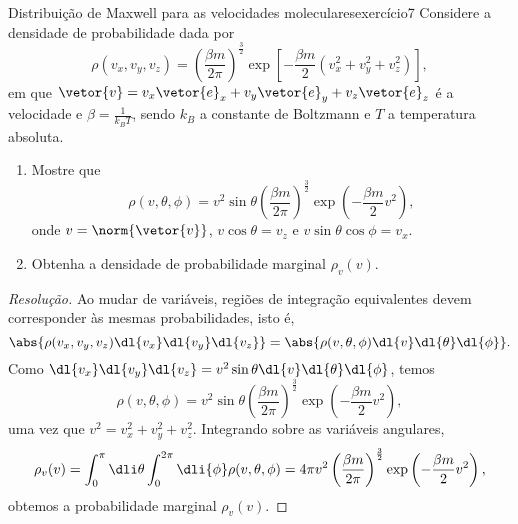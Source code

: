 \begin{exercício}{Distribuição de Maxwell para as velocidades moleculares}{exercício7}
    Considere a densidade de probabilidade dada por
    \begin{equation*}
        \rho(v_x,v_y,v_z) = \left(\frac{\beta m}{2\pi}\right)^{\frac32}\exp\left[-\frac{\beta m}{2} \left(v_x^2 + v_y^2 + v_z^2\right)\right],
    \end{equation*}
    em que \(\vetor{v} = v_x\vetor{e}_x+v_y\vetor{e}_y+v_z\vetor{e}_z\) é a velocidade e \(\beta = \frac{1}{k_BT}\), sendo \(k_B\) a constante de Boltzmann e \(T\) a temperatura absoluta.
    \begin{enumerate}[label=(\alph*)]
        \item Mostre que
            \begin{equation*}
                \rho(v, \theta, \phi) = v^2 \sin\theta\left(\frac{\beta m}{2\pi}\right)^{\frac32}\exp\left(-\frac{\beta m}{2} v^2\right),
            \end{equation*}
            onde \(v = \norm{\vetor{v}}\), \(v\cos\theta = v_z\) e \(v\sin\theta\cos\phi = v_x\).
        \item Obtenha a densidade de probabilidade marginal \(\rho_v(v)\).
    \end{enumerate}
\end{exercício}
\begin{proof}[Resolução]
    Ao mudar de variáveis, regiões de integração equivalentes devem corresponder às mesmas probabilidades, isto é,
    \begin{equation*}
        \abs{\rho(v_x, v_y, v_z) \dl{v_x}\dl{v_y}\dl{v_z}} = \abs{\rho(v, \theta, \phi) \dl{v}\dl{\theta}\dl{\phi}}.
    \end{equation*}
    Como \(\dl{v_x}\dl{v_y}\dl{v_z} = v^2 \sin\theta \dl{v} \dl{\theta}\dl{\phi}\), temos
    \begin{equation*}
        \rho(v, \theta, \phi) = v^2 \sin\theta \left(\frac{\beta m}{2\pi}\right)^{\frac32} \exp\left(- \frac{\beta m}{2} v^2\right),
    \end{equation*}
    uma vez que \(v^2 = v_x^2 + v_y^2 + v_z^2\). Integrando sobre as variáveis angulares,
    \begin{equation*}
        \rho_v(v) = \int_0^\pi \dli\theta \int_0^{2\pi} \dli{\phi} \rho(v, \theta, \phi) = 4\pi v^2 \left(\frac{\beta m}{2\pi}\right)^{\frac32} \exp\left(-\frac{\beta m}{2} v^2\right),
    \end{equation*}
    obtemos a probabilidade marginal \(\rho_v(v)\).
\end{proof}
